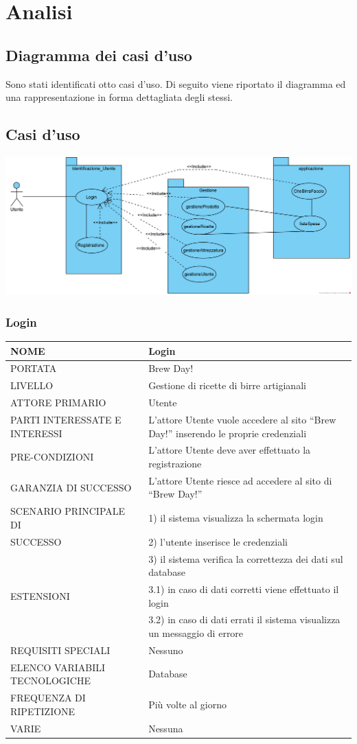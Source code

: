 \documentclass[a4paper, titlepage]{article}
\begin{document}
\section{Analisi}
\subsection{Diagramma dei casi d'uso}
Sono stati identificati otto casi d’uso. Di seguito viene riportato il diagramma ed una rappresentazione in forma dettagliata degli stessi.
\vphantom{}
\subsection{Casi d'uso}
\vphantom{}
\includegraphics[scale=0.65]{Immagini/Use Case Diagram_Brew Day!.png}
\vphantom{}
\subsubsection{Login}
\begin{longtable}{p{6cm}p{7cm}}\toprule
    NOME & Login\\\midrule
    PORTATA & Brew Day!\\\midrule
    LIVELLO & Gestione di ricette di birre artigianali\\\midrule
    ATTORE PRIMARIO & Utente\\\midrule
    PARTI INTERESSATE E INTERESSI & L’attore Utente vuole accedere al sito “Brew Day!” inserendo le proprie credenziali\\\midrule
    PRE-CONDIZIONI & L’attore Utente deve aver effettuato la registrazione\\\midrule
    GARANZIA DI SUCCESSO & L’attore Utente riesce ad accedere al sito di “Brew Day!”\\\midrule
    SCENARIO PRINCIPALE DI
    & 1) il sistema visualizza la schermata login\\
    SUCCESSO & 2) l’utente inserisce le credenziali\\
    & 3) il sistema verifica la correttezza
    dei dati sul database\\\midrule
    ESTENSIONI &
    3.1) in caso di dati corretti viene effettuato il login\\
    & 3.2) in caso di dati errati il sistema
    visualizza un messaggio di errore\\\midrule
    REQUISITI SPECIALI & Nessuno \\\midrule
    ELENCO VARIABILI TECNOLOGICHE & Database\\\midrule
    FREQUENZA DI RIPETIZIONE & Più volte al giorno\\\midrule
    VARIE & Nessuna\\\bottomrule
\end{longtable}
\vphantom{}
\end{document}
